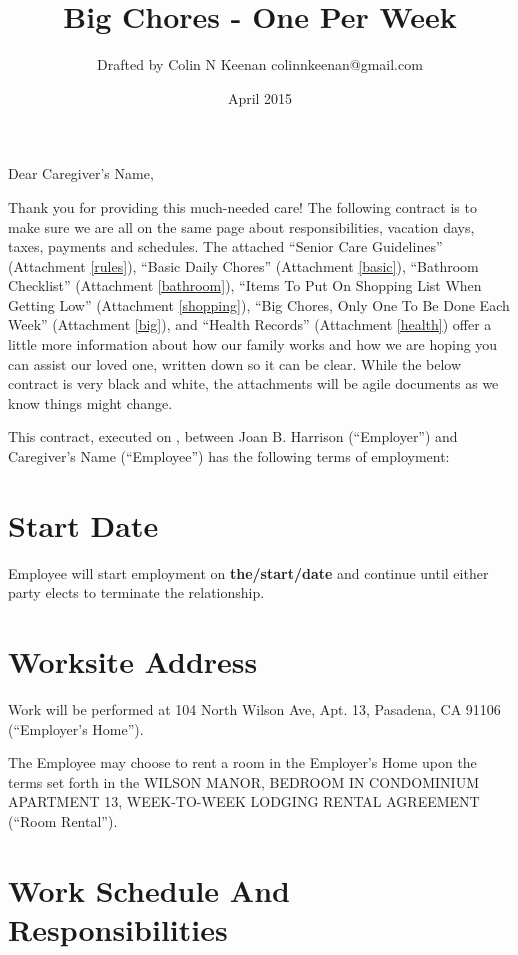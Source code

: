 \documentclass[]{article}
\newcommand{\mytitle}{Big Chores - One Per Week}
\newcommand{\agreementtitle}{WILSON MANOR, BEDROOM IN CONDOMINIUM APARTMENT 13, WEEK-TO-WEEK LODGING RENTAL AGREEMENT}
\newcommand{\startdate}{the/start/date}
\newcommand{\datefillin}{\hspace{0.2cm}\makebox[3cm]{\hrulefill}}
\newcommand{\caregiver}{Caregiver's Name}
\newcommand{\mom}{Joan B. Harrison}
\newcommand{\rules}{Senior Care Guidelines}
\newcommand{\basic}{Basic Daily Chores}
\newcommand{\bathroom}{Bathroom Checklist}
\newcommand{\shopping}{Items To Put On Shopping List When Getting Low}
\newcommand{\big}{Big Chores, Only One To Be Done Each Week}
\newcommand{\health}{Health Records}
\begin{document}
\title{\mytitle{}}
\author{Drafted by Colin N Keenan colinnkeenan@gmail.com}
\date{April 2015}
\maketitle
\thispagestyle{fancy}

Dear \caregiver{},

Thank you for providing this much-needed care! The following contract is to make sure we are all on the same page about responsibilities, vacation days, taxes, payments and schedules. The attached ``\rules{}'' (Attachment \ref{rules}), ``\basic{}'' (Attachment \ref{basic}), ``\bathroom{}'' (Attachment \ref{bathroom}), ``\shopping{}'' (Attachment \ref{shopping}), ``\big{}'' (Attachment \ref{big}), and ``\health{}'' (Attachment \ref{health}) offer a little more information about how our family works and how we are hoping you can assist our loved one, written down so it can be clear. While the below contract is very black and white, the attachments will be agile documents as we know things might change.

This contract, executed on \datefillin{}, between \mom{} (``Employer'') and \caregiver{} (``Employee'') has the following terms of employment:

\section{Start Date}

Employee will start employment on \textbf{\startdate{}} and continue until either party elects to terminate the relationship.

\section{Worksite Address}

Work will be performed at 104 North Wilson Ave, Apt. 13, Pasadena, CA 91106 (``Employer's Home'').

The Employee may choose to rent a room in the Employer's Home upon the terms set forth in the \agreementtitle{} (``Room Rental'').

\section{Work Schedule And Responsibilities}
\end{document}
